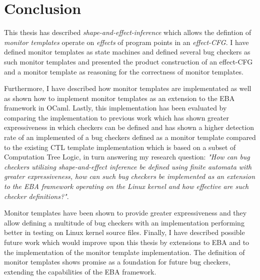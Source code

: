 \section{Conclusion}

This thesis has described \textit{shape-and-effect-inference} which allows the defintion of \textit{monitor templates} operate on \textit{effects} of program points in an \textit{effect-CFG}. I have defined monitor templates as state machines and defined several bug checkers as such monitor templates and presented the product construction of an effect-CFG and a monitor template as reasoning for the correctness of monitor templates. 

\newpar Furthermore, I have described how monitor templates are implementated as well as shown how to implement monitor templates as an extension to the EBA framework in OCaml. Lastly, this implementation has been evaluated by comparing the implementation to previous work which has shown greater expressiveness in which checkers can be defined and has shown a higher detection rate of an implemented of a bug checkers defined as a monitor template compared to the existing CTL template implementation which is based on a subset of Computation Tree Logic, in turn answering my research question: \textit{"How can bug checkers utilizing shape-and-effect inference be defined using finite automata with greater expressiveness, how can such bug checkers be implemented as an extension to the EBA framework operating on the Linux kernel and how effective are such checker definitions?"}.

\newpar Monitor templates have been shown to provide greater expressiveness and they allow defining a multitude of bug checkers with an implementation performing better in testing on Linux kernel source files. Finally, I have described possible future work which would improve upon this thesis by extensions to EBA and to the implementation of the monitor template implementation. The definition of monitor templates shows promise as a foundation for future bug checkers, extending the capabilities of the EBA framework. 